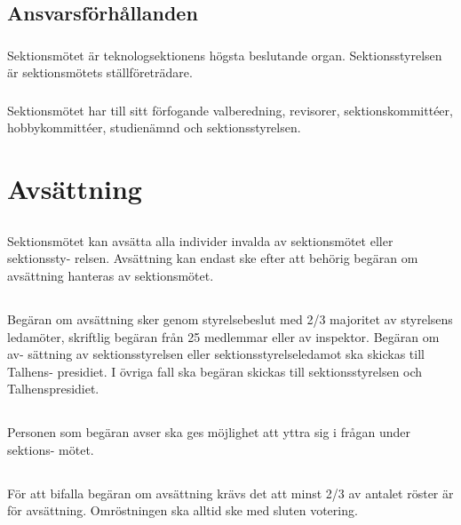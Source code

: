 \documentclass[a4paper]{dtek}
\begin{document}
\subsection{Ansvarsförhållanden}
\subsubsection{}
Sektionsmötet är teknologsektionens högsta beslutande organ. Sektionsstyrelsen är sektionsmötets ställföreträdare.
\subsubsection{}
Sektionsmötet har till sitt förfogande valberedning, revisorer, sektionskommittéer, hobbykommittéer, studienämnd och sektionsstyrelsen.
\newpage


\section{Avsättning}
\subsection{}
Sektionsmötet kan avsätta alla individer invalda av sektionsmötet eller sektionssty-
relsen. Avsättning kan endast ske efter att behörig begäran om avsättning hanteras
av sektionsmötet. 
\subsection{}
Begäran om avsättning sker genom styrelsebeslut med 2/3 majoritet av styrelsens
ledamöter, skriftlig begäran från 25 medlemmar eller av inspektor. Begäran om av-
sättning av sektionsstyrelsen eller sektionsstyrelseledamot ska skickas till Talhens-
presidiet. I övriga fall ska begäran skickas till sektionsstyrelsen och Talhenspresidiet.
\subsection{}
Personen som begäran avser ska ges möjlighet att yttra sig i frågan under sektions-
mötet.
\subsection{}
För att bifalla begäran om avsättning krävs det att minst 2/3 av antalet röster är
för avsättning. Omröstningen ska alltid ske med sluten votering.
\end{document}
